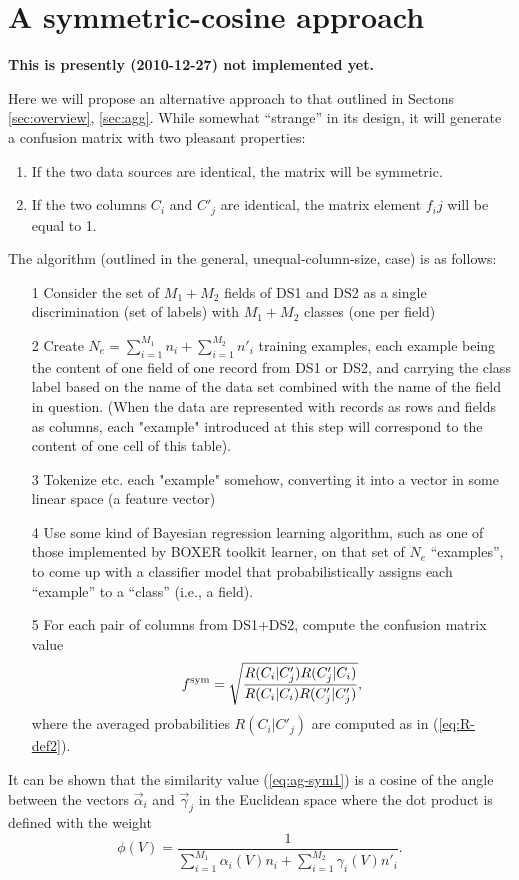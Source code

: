 \documentclass[12pt]{article}
\begin{document}
\section{A symmetric-cosine approach}

{\bf This is presently (2010-12-27) not implemented yet.}

Here we will propose an alternative approach to that outlined in
Sectons \ref{sec:overview}, \ref{sec:agg}. While somewhat ``strange''
in its design, it will generate a confusion matrix with two pleasant
properties:
\begin{enumerate}
\item If the two data sources are identical, the matrix will be symmetric.
\item If the two columns $C_i$ and $C'_j$ are identical, the matrix element $f_ij$ will be equal to 1.
\end{enumerate}

The algorithm (outlined in the general, unequal-column-size, case) is
as follows:

\begin{enumerate}
\item[1] Consider the set of $M_1+M_2$ fields of DS1 and DS2 as a single
  discrimination (set of labels) with $M_1+M_2$ classes (one per field)

\item[2] Create $N_e = \sum_{i=1}^{M_1} n_i + \sum_{i=1}^{M_2} n'_i$
  training examples, each example being the content of one field of
  one record from DS1 or DS2, and carrying the class label based on
  the name of the data set combined with the name of the field in
  question. (When the data are represented with records as rows and
  fields as columns, each "example" introduced at this step will
  correspond to the content of one cell of this table).

\item[3] Tokenize etc. each "example" somehow, converting it into a
  vector in some linear space (a feature vector)

\item[4] Use some kind of Bayesian regression learning algorithm, such
  as one of those implemented by BOXER toolkit learner, on that set of $N_e$
  ``examples'', to come up with a classifier model that
  probabilistically assigns each ``example'' to a ``class'' (i.e., a
  field). 

\item[5] For each pair of columns from DS1+DS2, compute the confusion
  matrix value
\begin{equation}
\label{eq:ag-sym1}
f^{\rm sym} = \sqrt{\frac{ R(C_i|C'_j) R(C'_j|C_i) }{ R(C_i|C_i) R(C'_j|C'_j)}},
\end{equation}
where the averaged probabilities  $R(C_i|C'_j)$ are computed as in (\ref{eq:R-def2}).
\end{enumerate}

It can be shown that the similarity value (\ref{eq:ag-sym1}) is a
cosine of the angle between the vectors $\vec\alpha_i$ and
$\vec\gamma_j$ in the Euclidean space where the dot product is defined
with the weight
$$
\phi(V) =
 \frac{1}{ \sum_{i=1}^{M_1} \alpha_i(V) n_i + \sum_{i=1}^{M_2} \gamma_i(V) n'_i}.
$$
\end{document}
